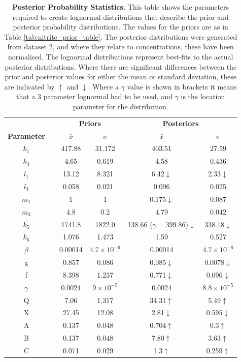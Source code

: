 \begin{table}[tbp]%
\renewcommand{\arraystretch}{1.5}
\begin{center}
\begin{tabular}{cccccc}
\toprule
& & \multicolumn{2}{c}{\textbf{Priors}} & \multicolumn{2}{c}{\textbf{Posteriors}} \\
\textbf{Parameter} && ${\bar{x}}$ & $\sigma$ & ${\bar{x}}$ & $\sigma$\\
\midrule
$k_1$ && 417.88 & 31.172 & 403.51 & 27.59\\
$k_3$ && 4.65 & 0.619 & 4.58 & 0.436\\
$l_1$ && 13.12 & 8.321 & 6.42$\downarrow$ & 2.33$\downarrow$\\
$l_3$ && 0.058 & 0.021 & 0.096 & 0.025\\
$m_1$ && 1 & 1 & 0.175$\downarrow$ & 0.087\\
$m_3$ && 4.8 & 0.2 & 4.79 & 0.042\\
$k_5$ && 1741.8 & 1822.0 & 138.66 ($\gamma = 399.86$)$\downarrow$ & 338.18$\downarrow$\\
$k_6$ && 1.076 & 1.473 & 1.59 & 0.527\\
$\beta$ && 0.00014 & $4.7\times 10^{-6}$ & 0.00014 & $4.7\times 10^{-6}$\\
g && 0.857 & 0.086 & 0.085$\downarrow$ & 0.0078$\downarrow$\\
f && 8.398 & 1.237 & 0.771$\downarrow$ & 0.096$\downarrow$\\
$\gamma$ && 0.0024 & $9\times 10^{-5}$ & 0.0024 & $8.8\times 10^{-5}$\\
Q && 7.06 & 1.317 & 34.31$\uparrow$ & 5.49$\uparrow$\\
X && 27.45 & 12.08 & 2.81$\downarrow$ & 0.595$\downarrow$\\
A && 0.137 & 0.048 & 0.704$\uparrow$ & 0.3$\uparrow$\\
B && 0.137 & 0.048 & 7.80$\uparrow$ & 3.63$\uparrow$\\
C && 0.071 & 0.029 & 1.3$\uparrow$ & 0.259$\uparrow$\\
\bottomrule
\end{tabular}
\end{center}
\caption[Posterior Probability Statistics]{{\bf Posterior Probability Statistics.} This table shows the parameters required to create lognormal distributions that describe the prior and posterior probability distributions. The values for the priors are as in Table \ref{tab:nitrite_prior_table}. The posterior distributions were generated from dataset 2, and where they relate to concentrations, these have been normalised. The lognormal distributions represent best-fits to the actual posterior distributions. Where there are significant differences between the prior and posterior values for either the mean or standard deviation, these are indicated by $\uparrow$ and $\downarrow$. Where a $\gamma$ value is shown in brackets it means that a 3 parameter lognormal had to be used, and $\gamma$ is the location parameter for the distribution.
\label{tab:nitrite-posteriors-table}}
\end{table}

